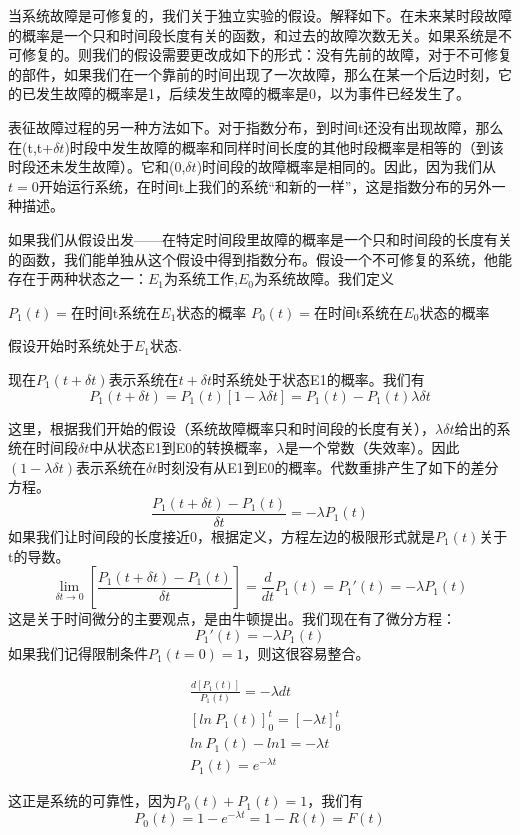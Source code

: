 \documentclass[cn,11pt,chinese]{elegantbook}
\begin{document}
{当系统故障是可修复的，我们关于独立实验的假设。解释如下。在未来某时段故障的概率是一个只和时间段长度有关的函数，和过去的故障次数无关。如果系统是不可修复的。则我们的假设需要更改成如下的形式：没有先前的故障，对于不可修复的部件，如果我们在一个靠前的时间出现了一次故障，那么在某一个后边时刻，它的已发生故障的概率是1，后续发生故障的概率是0，以为事件已经发生了。

表征故障过程的另一种方法如下。对于指数分布，到时间t还没有出现故障，那么在(t,t+$\delta t$)时段中发生故障的概率和同样时间长度的其他时段概率是相等的（到该时段还未发生故障）。它和(0,$\delta t$)时间段的故障概率是相同的。因此，因为我们从$t=0$开始运行系统，在时间t上我们的系统“和新的一样”，这是指数分布的另外一种描述。

如果我们从假设出发——在特定时间段里故障的概率是一个只和时间段的长度有关的函数，我们能单独从这个假设中得到指数分布。假设一个不可修复的系统，他能存在于两种状态之一：$E_1$为系统工作,$E_0$为系统故障。我们定义

$P_1(t)=$在时间t系统在$E_1$状态的概率 
$P_0(t)=$在时间t系统在$E_0$状态的概率

假设开始时系统处于$E_1$状态.

现在$P_1(t+\delta t)$表示系统在$t+\delta t$时系统处于状态E1的概率。我们有
$$P_1(t+\delta t)=P_1(t)[1-\lambda \delta t]=P_1(t)-P_1(t)\lambda \delta t$$

这里，根据我们开始的假设（系统故障概率只和时间段的长度有关），$\lambda \delta t$给出的系统在时间段$\delta t$中从状态E1到E0的转换概率，$\lambda$是一个常数（失效率）。因此$(1-\lambda \delta t)$表示系统在$\delta t$时刻没有从E1到E0的概率。代数重排产生了如下的差分方程。
$$\frac{P_1(t+\delta t)-P_1(t)}{\delta t}=-\lambda P_1(t)$$
如果我们让时间段的长度接近0，根据定义，方程左边的极限形式就是$P_1(t)$关于t的导数。
$$\lim_{\delta t \to 0}[\frac{P_1(t+\delta t)-P_1(t)}{\delta t}]=\frac{d}{dt}P_1(t)=P_1 '(t)= -\lambda P_1(t)$$
这是关于时间微分的主要观点，是由牛顿提出。我们现在有了微分方程：
$$P_1'(t)=-\lambda P_1(t)$$
如果我们记得限制条件$P_1(t=0)=1$，则这很容易整合。

\begin{align*}
&\frac{d[P_1(t)]}{P_1(t)}=-\lambda dt    \\
&[ln\ P_1(t)]^t_0=[-\lambda t]_0^t  \\
& ln \ P_1(t)-ln 1=-\lambda t
\\
&P_1(t)=e^{-\lambda t}
\end{align*}

这正是系统的可靠性，因为$P_0(t)+P_1(t)=1$，我们有
$$P_0(t)=1-e^{-\lambda t}=1-R(t)=F(t)$$

}
\end{document}
